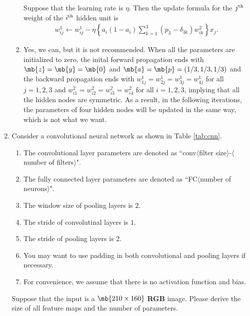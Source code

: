 \begin{exercise}
\begin{enumerate}
\begin{solution}
\begin{enumerate}
                        Suppose that the learning rate is $\eta$. Then the update formula for the $j^{\rm th}$ weight of the $i^{\rm th}$ hidden unit is
                        \begin{align*}
                            w^1_{ij} \leftarrow w^1_{ij} - \eta \left\{a_i(1-a_i) \sum_{k=1}^3 (p_3 - \delta_{3k}) w^2_{ik}\right\} x_j.
                        \end{align*}
                    \item Yes, we can, but it is not recommended. When all the parameters are initialized to zero, the inital forward propagation ends with $\mb{z} = \mb{y} = \mb{0}$ and $\mb{a} = \mb{p} = (1/3, 1/3, 1/3)$ and the backward propagation ends with $w^1_{1j} = w^1_{2j} = w^1_{3j} = w^1_{4j}$ for all $j = 1,2,3$ and $w^2_{i1} = w^2_{i2} = w^2_{i3} = w^2_{i4}$ for all $i = 1,2,3$, implying that all the hidden nodes are symmetric. As a result, in the following iterations, the parameters of four hidden nodes will be updated in the same way, which is not what we want. \qedhere
                \end{enumerate}
            \end{solution}

        \item Consider a convolutional neural network as shown in Table \ref{tab:cnn}.
            \begin{enumerate}
                \item The convolutional layer parameters are denoted as ``conv$\langle$filter size$\rangle$-$\langle$number of filters$\rangle$".
                \item  The fully connected layer parameters are denoted as ``FC$\langle$number of neurons$\rangle$".
                \item The window size of pooling layers is $2$.
                \item The stride of convolutinal layers is $1$.
                \item The stride of pooling layers is $2$.
                \item You may want to use padding in both convolutional and pooling layers if necessary.
                \item For convenience, we assume that there is no activation function and bias.
            \end{enumerate}

            Suppose that the input is a $\mb{210\times 160}$ \textbf{RGB} image. Please derive the size of all feature maps and the number of parameters.


\end{enumerate}
\end{exercise}
